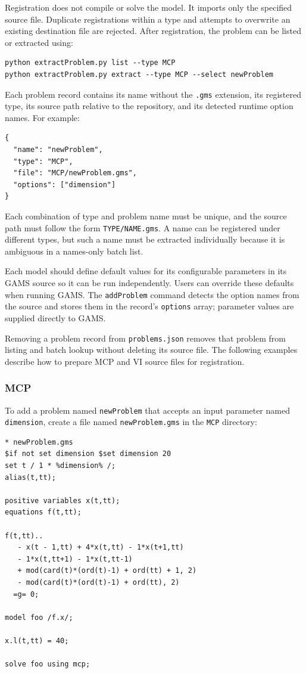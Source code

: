Registration does not compile or solve the model. It imports only the specified source file. Duplicate registrations within a type and attempts to overwrite an existing destination file are rejected. After registration, the problem can be listed or extracted using:

\begin{verbatim}
python extractProblem.py list --type MCP
python extractProblem.py extract --type MCP --select newProblem
\end{verbatim}

Each problem record contains its name without the \texttt{.gms} extension, its registered type, its source path relative to the repository, and its detected runtime option names. For example:

\begin{verbatim}
{
  "name": "newProblem",
  "type": "MCP",
  "file": "MCP/newProblem.gms",
  "options": ["dimension"]
}
\end{verbatim}

Each combination of type and problem name must be unique, and the source path must follow the form \texttt{TYPE/NAME.gms}. A name can be registered under different types, but such a name must be extracted individually because it is ambiguous in a names-only batch list.

Each model should define default values for its configurable parameters in its GAMS source so it can be run independently. Users can override these defaults when running GAMS. The \texttt{addProblem} command detects the option names from the source and stores them in the record's \texttt{options} array; parameter values are supplied directly to GAMS.

Removing a problem record from \texttt{problems.json} removes that problem from listing and batch lookup without deleting its source file. The following examples describe how to prepare MCP and VI source files for registration.

\subsubsection{MCP}

To add a problem named \texttt{newProblem} that accepts an input parameter named \texttt{dimension}, create a file named \texttt{newProblem.gms} in the \texttt{MCP} directory:

\begin{verbatim}
* newProblem.gms
$if not set dimension $set dimension 20
set t / 1 * %dimension% /;
alias(t,tt);

positive variables x(t,tt);
equations f(t,tt);

f(t,tt)..
   - x(t - 1,tt) + 4*x(t,tt) - 1*x(t+1,tt) 
   - 1*x(t,tt+1) - 1*x(t,tt-1)
   + mod(card(t)*(ord(t)-1) + ord(tt) + 1, 2)
   - mod(card(t)*(ord(t)-1) + ord(tt), 2)
  =g= 0;

model foo /f.x/;

x.l(t,tt) = 40;

solve foo using mcp;
\end{verbatim}

